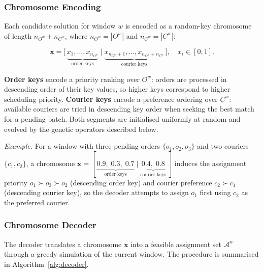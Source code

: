 \subsubsection{Chromosome Encoding}\label{subsubsec:encoding}

Each candidate solution for window $w$ is encoded as a
random-key chromosome~\cite{bean1994} of length
$n_{O^w} + n_{C^w}$, where $n_{O^w} = |O^w|$ and
$n_{C^w} = |C^w|$:

\begin{equation}
    \mathbf{x} = \bigl[\,
        \underbrace{x_1, \ldots, x_{n_{O^w}}}_{\text{order keys}}\;
        \Big|\;
        \underbrace{x_{n_{O^w}+1}, \ldots, x_{n_{O^w}+n_{C^w}}}_{\text{courier keys}}\,
    \bigr], \quad x_i \in [0,1].
\end{equation}

\noindent
\textbf{Order keys} encode a priority ranking over $O^w$:
orders are processed in descending order of their key values,
so higher keys correspond to higher scheduling priority.
\textbf{Courier keys} encode a preference ordering over $C^w$:
available couriers are tried in descending key order when
seeking the best match for a pending batch.
Both segments are initialised uniformly at random and
evolved by the genetic operators described below.

\noindent\textit{Example.}
For a window with three pending orders $\{o_1,o_2,o_3\}$ and
two couriers $\{c_1,c_2\}$, a chromosome
$\mathbf{x} = [\,\underbrace{0.9,\;0.3,\;0.7}_{\text{order keys}}\mid
\underbrace{0.4,\;0.8}_{\text{courier keys}}\,]$
induces the assignment priority $o_1 \succ o_3 \succ o_2$
(descending order key) and courier preference $c_2 \succ c_1$
(descending courier key), so the decoder attempts to assign $o_1$
first using $c_2$ as the preferred courier.

\subsubsection{Chromosome Decoder}\label{subsubsec:decoder}

The decoder translates a chromosome $\mathbf{x}$ into a feasible
assignment set $\mathcal{A}^w$ through a greedy simulation of
the current window.
The procedure is summarised in Algorithm~\ref{alg:decoder}.

